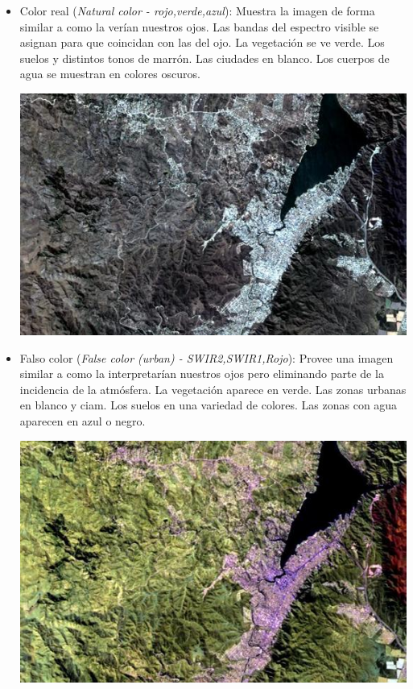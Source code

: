 \documentclass[a4paper,12pt]{book}
\begin{document}
\begin{itemize}
    \item Color real (\emph{Natural color - rojo,verde,azul}): Muestra la imagen de forma similar a como la verían nuestros ojos. Las bandas del espectro visible se asignan para que coincidan con  las del ojo. La vegetación se ve verde. Los suelos y distintos tonos de marrón. Las ciudades en blanco. Los cuerpos de agua se muestran en colores oscuros.
    \begin{center}\includegraphics[scale=0.4]{4-3-2.jpeg}\end{center}
    \item Falso color (\emph{False color (urban) - SWIR2,SWIR1,Rojo}): Provee una imagen similar a como la interpretarían nuestros ojos pero eliminando parte de la incidencia de la atmósfera. La vegetación aparece en verde. Las zonas urbanas en blanco y ciam. Los suelos en una variedad de colores. Las zonas con agua aparecen en azul o negro.
    \begin{center}\includegraphics[scale=0.4]{12-11-4.jpeg}\end{center}

\end{itemize}
\end{document}
